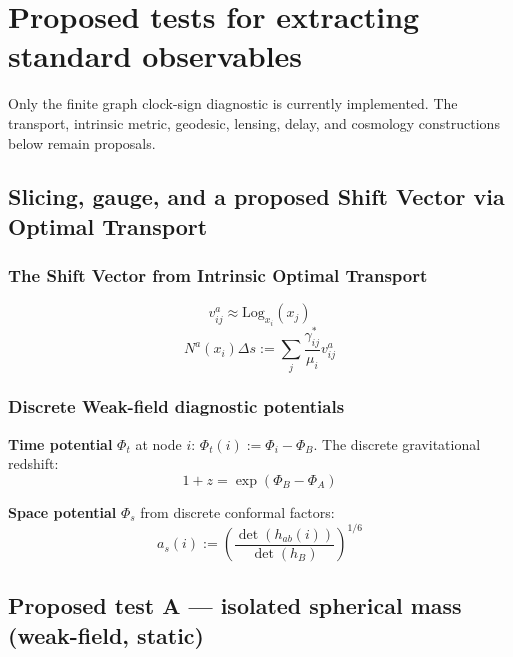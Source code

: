 \documentclass[reprint, amsmath, amssymb, aps, prd]{revtex4-2}
\begin{document}
\section{Proposed tests for extracting standard observables}

Only the finite graph clock-sign diagnostic is currently implemented. The transport,
intrinsic metric, geodesic, lensing, delay, and cosmology constructions below remain
proposals.

\subsection{Slicing, gauge, and a proposed Shift Vector via Optimal Transport}
\subsubsection{The Shift Vector from Intrinsic Optimal Transport}
\begin{equation}
v_{ij}^a \approx \text{Log}_{x_i}(x_j)
\end{equation}
\begin{equation}
N^a(x_i) \Delta s := \sum_j \frac{\gamma_{ij}^*}{\mu_i} v_{ij}^a
\end{equation}

\subsubsection{Discrete Weak-field diagnostic potentials}
\textbf{Time potential} $\Phi_t$ at node $i$: $\Phi_t(i) := \Phi_i - \Phi_B$. 
The discrete gravitational redshift:
\begin{equation}
1 + z = \exp(\Phi_B - \Phi_A)
\end{equation}

\textbf{Space potential} $\Phi_s$ from discrete conformal factors:
\begin{equation}
a_s(i) := \left( \frac{\det(h_{ab}(i))}{\det(h_B)} \right)^{1/6}
\end{equation}

\subsection{Proposed test A --- isolated spherical mass (weak-field, static)}
\end{document}
